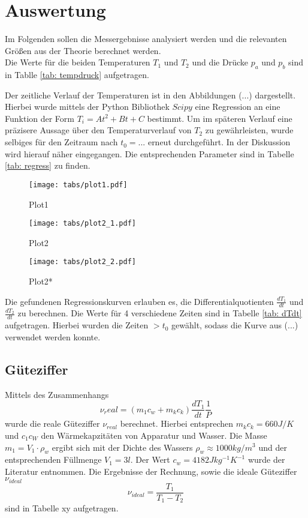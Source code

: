 \section{Auswertung}
Im Folgenden sollen die Messergebnisse analysiert werden und die relevanten Größen aus der Theorie berechnet werden. \\
Die Werte für die beiden Temperaturen $T_1$ und $T_2$ und die Drücke $p_a$ und $p_b$ sind in Tablle \ref{tab: tempdruck} aufgetragen.

Der zeitliche Verlauf der Temperaturen ist in den Abbildungen (...) dargestellt. Hierbei wurde mittels der Python Bibliothek $Scipy$ eine
Regression an eine Funktion der Form $T_i = A t^2 + B t + C$ bestimmt. Um im späteren Verlauf eine präzisere Aussage über den Temperaturverlauf
von $T_2$ zu gewährleisten, wurde selbiges für den Zeitraum nach $t_0 = ...$ erneut durchgeführt. In der Diskussion wird hierauf näher eingegangen. Die entsprechenden
Parameter sind in Tabelle \ref{tab: regress} zu finden. \\
\begin{figure}
  \centering
  \texttt{[image: tabs/plot1.pdf]}
  \caption{Plot1}
  \label{fig: Plot1}
\end{figure}

\begin{figure}
  \centering
  \texttt{[image: tabs/plot2\_1.pdf]}
  \caption{Plot2}
  \label{fig: Plot2}
\end{figure}

\begin{figure}
  \centering
  \texttt{[image: tabs/plot2\_2.pdf]}
  \caption{Plot2*}
  \label{fig: Plot2*}
\end{figure}


Die gefundenen Regressionskurven erlauben es, die Differentialquotienten $\frac{dT_1}{dt}$ und $\frac{dT_2}{dt}$ zu berechnen. Die Werte für 4 verschiedene Zeiten sind
in Tabelle \ref{tab: dTdt} aufgetragen. Hierbei wurden die Zeiten $> t_0$ gewählt, sodass die Kurve aus (...) verwendet werden konnte.

\subsection{Güteziffer}

Mittels des Zusammenhangs
\begin{equation}
  \nu_real = (m_1 c_w + m_k c_k) \frac{dT_1}{dt} \frac{1}{P}
\end{equation}
wurde die reale Güteziffer $\nu_{real}$ berechnet. Hierbei entsprechen $m_k c_k = 660 J/K$ und $c_1 c_W$ den Wärmekapzitäten von Apparatur und Wasser. Die Masse $m_1 = V_1 \cdot \rho_w$ ergibt sich mit
der Dichte des Wassers $\rho_w \approx 1000 kg/m^3$ und der entsprechenden Füllmenge $V_1 = 3 l$. Der Wert $c_w = 4182 Jkg^{-1}K^{-1}$ wurde der Literatur entnommen. Die Ergebnisse
der Rechnung, sowie die ideale Güteziffer $\nu_{ideal}$
\begin{equation}
  \nu_{ideal} = \frac{T_1}{T_1 - T_2}
\end{equation}
sind in Tabelle xy aufgetragen.


